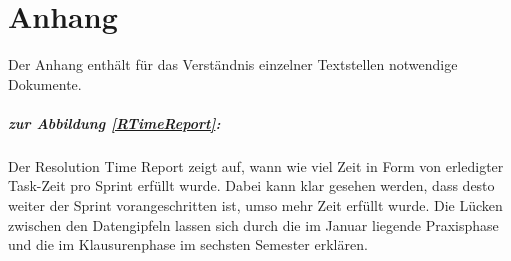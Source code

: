 \chapter{Anhang}

Der Anhang enthält für das Verständnis einzelner Textstellen notwendige Dokumente.

\paragraph{zur Abbildung \ref{RTimeReport}:} Der Resolution Time Report zeigt auf, wann wie viel Zeit in Form von erledigter Task-Zeit pro Sprint erfüllt wurde. Dabei kann klar gesehen werden, dass desto weiter der Sprint vorangeschritten ist, umso mehr Zeit erfüllt wurde. Die Lücken zwischen den Datengipfeln lassen sich durch die im Januar liegende Praxisphase und die im Klausurenphase im sechsten Semester erklären.

